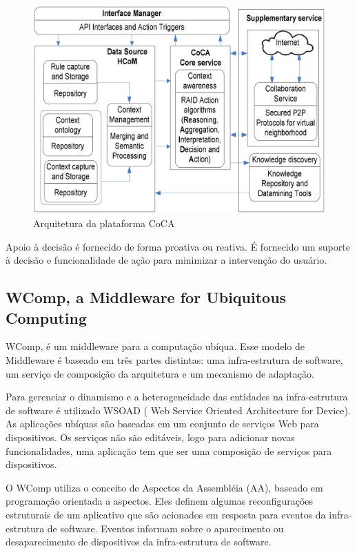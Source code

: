 \documentclass[12pt,a4paper,compsoc]{IEEEtran}
\begin{document}
  \begin{figure}[ht]
    \centerline{\includegraphics[scale=.15]{imagens/arquitetura-coca}}
    \caption{Arquitetura da plataforma CoCA \cite{ejigu2008hybrid}}
    \label{arquitetura-coca}
  \end{figure}
  
  Apoio à decisão é fornecido de forma proativa ou reativa. É fornecido um suporte à decisão e 
  funcionalidade de ação para minimizar a intervenção do usuário.


\subsection{WComp, a Middleware for Ubiquitous Computing}

  WComp, é um middleware para a computação ubíqua. Esse modelo de Middleware é baseado em três
  partes distintas: uma infra-estrutura de software,  um serviço de composição da arquitetura e um
  mecanismo de adaptação.
  
  Para gerenciar o dinamismo e a heterogeneidade das entidades na infra-estrutura de software é
  utilizado WSOAD ( Web Service Oriented Architecture for Device). As aplicações ubíquas são
  baseadas em um conjunto de serviços Web para dispositivos. Os serviços não são editáveis, logo
  para adicionar novas funcionalidades, uma aplicação tem que ser uma composição de serviços para
  dispositivos.
  
  O WComp utiliza o conceito de Aspectos da Assembléia (AA), baseado em programação orientada a
  aspectos. Eles definem algumas reconfigurações estruturais de um aplicativo que são acionados em
  resposta para eventos da infra-estrutura de software. Eventos informam sobre o aparecimento ou
  desaparecimento de dispositivos da infra-estrutura de software.
  
\end{document}
